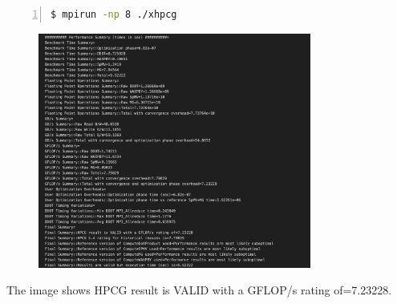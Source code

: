 \documentclass{article}
\begin{document}
\begin{lstlisting}[language=bash, basicstyle=\ttfamily\small, numbers=left, numberstyle=\tiny\color{gray}, stepnumber=1, frame=single]
$ mpirun -np 8 ./xhpcg
\end{lstlisting}

\begin{figure}[htbp]
    \centering
    \includegraphics[width=0.8\textwidth]{./img/HPCG_64_64_64.png}
\end{figure}

The image shows HPCG result is VALID with a GFLOP/s rating of=7.23228.
\end{document}
